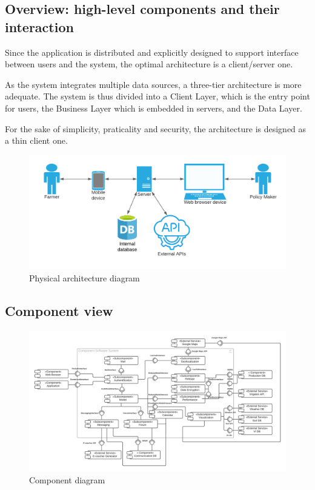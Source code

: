 \subsection{Overview: high-level components and their interaction}

Since the application is distributed and explicitly designed to support interface between users and the system, the optimal architecture is a client/server one. 

As the system integrates multiple data sources, a three-tier architecture is more adequate. The system is thus divided into a Client Layer, which is the entry point for users, the Business Layer which is embedded in servers, and the Data Layer. 

For the sake of simplicity, praticality and security, the architecture is designed as a thin client one.

\begin{figure} [!h]
	\centering
	\includegraphics[width=\textwidth]{Images/architecture-diagram.png}
	\caption{\label{fig:physical_diag} Physical architecture diagram}
\end{figure}


\subsection{Component view}
\begin{figure} [!h]
	\centering
	\includegraphics[width=\textwidth]{Images/component-diagram.png}
	\caption{\label{fig:component_diag} Component diagram}
\end{figure}

